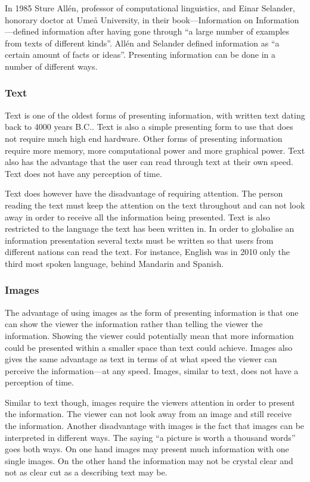 In 1985 Sture All{\'e}n, professor of computational linguistics, and Einar Selander, honorary doctor at Ume{\aa} University, in their book---Information on Information---defined information after having gone through ``a large number of examples from texts of different kinds''. All{\'e}n and Selander defined information as ``a certain amount of facts or ideas''.\cite{informationDef1} Presenting information can be done in a number of different ways.

\subsubsection{Text}
Text is one of the oldest forms of presenting information, with written text dating back to 4000 years B.C..\cite{cuneiform} Text is also a simple presenting form to use that does not require much high end hardware. Other forms of presenting information require more memory, more computational power and more graphical power. Text also has the advantage that the user can read through text at their own speed. Text does not have any perception of time.

Text does however have the disadvantage of requiring attention. The person reading the text must keep the attention on the text throughout and can not look away in order to receive all the information being presented. Text is also restricted to the language the text has been written in. In order to globalise an information presentation several texts must be written so that users from different nations can read the text. For instance, English was in 2010 only the third most spoken language, behind Mandarin and Spanish.\cite{sprakNe}

\subsubsection{Images}
The advantage of using images as the form of presenting information is that one can show the viewer the information rather than telling the viewer the information. Showing the viewer could potentially mean that more information could be presented within a smaller space than text could achieve. Images also gives the same advantage as text in terms of at what speed the viewer can perceive the information---at any speed. Images, similar to text, does not have a perception of time.

Similar to text though, images require the viewers attention in order to present the information. The viewer can not look away from an image and still receive the information. Another disadvantage with images is the fact that images can be interpreted in different ways. The saying ``a picture is worth a thousand words'' goes both ways. On one hand images may present much information with one single images. On the other hand the information may not be crystal clear and not as clear cut as a describing text may be.

